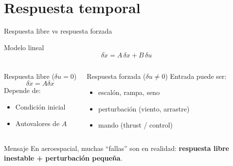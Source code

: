 \documentclass[aspectratio=169,10pt]{beamer}
\newcommand{\importantbox}[2][Importante]{%
\begin{alertblock}{#1}#2\end{alertblock}}
\begin{document}
\section{Respuesta temporal}

\begin{frame}{Respuesta libre vs respuesta forzada}
\small

\begin{block}{Modelo lineal}
\[
\delta \dot{x} = A\,\delta x + B\,\delta u
\]
\end{block}

\begin{columns}[T]
\begin{block}{Respuesta libre ($\delta u=0$)}
\[
\delta \dot{x}=A\delta x
\]
Depende de:
\begin{itemize}
\item Condición inicial
\item Autovalores de $A$
\end{itemize}
\end{block}

\begin{block}{Respuesta forzada ($\delta u\neq 0$)}
Entrada puede ser:
\begin{itemize}
\item escalón, rampa, seno
\item perturbación (viento, arrastre)
\item mando (thrust / control)
\end{itemize}
\end{block}
\end{columns}

\importantbox[Mensaje]{
En aeroespacial, muchas ``fallas'' son en realidad:
\textbf{respuesta libre inestable + perturbación pequeña}.
}

\end{frame}
\end{document}
